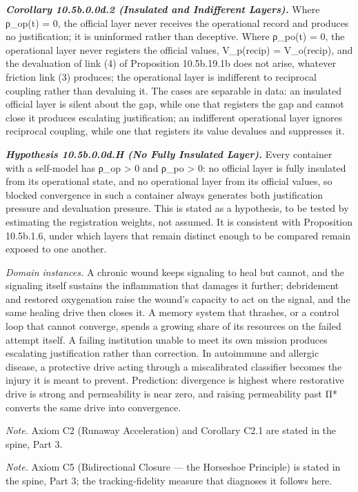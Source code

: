\documentclass[
]{article}
\begin{document}
\emph{\textbf{Corollary 10.5b.0.0d.2 (Insulated and Indifferent
Layers).}} Where ρ\_op(t) = 0, the official layer never receives the
operational record and produces no justification; it is uninformed
rather than deceptive. Where ρ\_po(t) = 0, the operational layer never
registers the official values, V\_p(recip) = V\_o(recip), and the
devaluation of link (4) of Proposition 10.5b.19.1b does not arise,
whatever friction link (3) produces; the operational layer is
indifferent to reciprocal coupling rather than devaluing it. The cases
are separable in data: an insulated official layer is silent about the
gap, while one that registers the gap and cannot close it produces
escalating justification; an indifferent operational layer ignores
reciprocal coupling, while one that registers its value devalues and
suppresses it.

\emph{\textbf{Hypothesis 10.5b.0.0d.H (No Fully Insulated Layer).}}
Every container with a self-model has ρ\_op \textgreater{} 0 and ρ\_po
\textgreater{} 0: no official layer is fully insulated from its
operational state, and no operational layer from its official values, so
blocked convergence in such a container always generates both
justification pressure and devaluation pressure. This is stated as a
hypothesis, to be tested by estimating the registration weights, not
assumed. It is consistent with Proposition 10.5b.1.6, under which layers
that remain distinct enough to be compared remain exposed to one
another.

\emph{Domain instances.} A chronic wound keeps signaling to heal but
cannot, and the signaling itself sustains the inflammation that damages
it further; debridement and restored oxygenation raise the wound's
capacity to act on the signal, and the same healing drive then closes
it. A memory system that thrashes, or a control loop that cannot
converge, spends a growing share of its resources on the failed attempt
itself. A failing institution unable to meet its own mission produces
escalating justification rather than correction. In autoimmune and
allergic disease, a protective drive acting through a miscalibrated
classifier becomes the injury it is meant to prevent. Prediction:
divergence is highest where restorative drive is strong and permeability
is near zero, and raising permeability past Π* converts the same drive
into convergence.

\emph{Note.} Axiom C2 (Runaway Acceleration) and Corollary C2.1 are
stated in the spine, Part 3.

\emph{Note.} Axiom C5 (Bidirectional Closure --- the Horseshoe
Principle) is stated in the spine, Part 3; the tracking-fidelity measure
that diagnoses it follows here.
\end{document}
